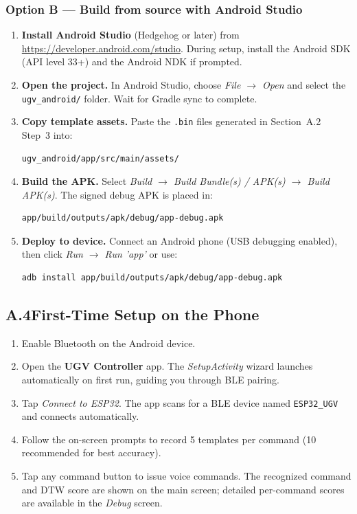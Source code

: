 \documentclass[conference]{IEEEtran}
\begin{document}
\subsubsection*{Option B — Build from source with Android Studio}
\begin{enumerate}
  \item \textbf{Install Android Studio} (Hedgehog or later) from
    \url{https://developer.android.com/studio}.
    During setup, install the Android SDK (API level 33+) and
    the Android NDK if prompted.

  \item \textbf{Open the project.}
    In Android Studio, choose \textit{File $\to$ Open} and select the
    \texttt{ugv\_android/} folder. Wait for Gradle sync to complete.

  \item \textbf{Copy template assets.}
    Paste the \texttt{.bin} files generated in Section~A.2 Step~3 into:
\begin{lstlisting}
ugv_android/app/src/main/assets/
\end{lstlisting}

  \item \textbf{Build the APK.}
    Select \textit{Build $\to$ Build Bundle(s) / APK(s) $\to$
    Build APK(s)}. The signed debug APK is placed in:
\begin{lstlisting}
app/build/outputs/apk/debug/app-debug.apk
\end{lstlisting}

  \item \textbf{Deploy to device.}
    Connect an Android phone (USB debugging enabled), then click
    \textit{Run $\to$ Run 'app'} or use:
\begin{lstlisting}[language=bash]
adb install app/build/outputs/apk/debug/app-debug.apk
\end{lstlisting}
\end{enumerate}

\subsection*{A.4\quad First-Time Setup on the Phone}

\begin{enumerate}
  \item Enable Bluetooth on the Android device.
  \item Open the \textbf{UGV Controller} app.
    The \textit{SetupActivity} wizard launches automatically on first
    run, guiding you through BLE pairing.
  \item Tap \textit{Connect to ESP32}. The app scans for a BLE device
    named \texttt{ESP32\_UGV} and connects automatically.
  \item Follow the on-screen prompts to record 5 templates per command
    (10 recommended for best accuracy).
  \item Tap any command button to issue voice commands. The recognized
    command and DTW score are shown on the main screen; detailed
    per-command scores are available in the \textit{Debug} screen.
\end{enumerate}
\end{document}
